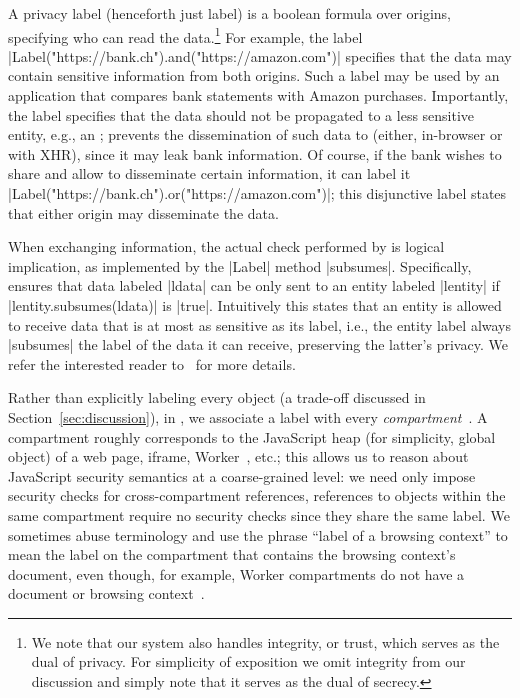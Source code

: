 A privacy label (henceforth just label) is a boolean formula over
origins, specifying who can read the data.\footnote{
  We note that our system also handles integrity, or trust, which
  serves as the dual of privacy.
  For simplicity of exposition we omit integrity from our discussion
  and simply note that it serves as the dual of secrecy.

}
%
For example, the label
\js|Label("https://bank.ch").and("https://amazon.com")| specifies that
the data may contain sensitive information from both origins.
%
Such a label may be used by an application that compares bank
statements with Amazon purchases.
%
Importantly, the label specifies that the data should not be
propagated to a less sensitive entity, e.g., an ;
\sys{} prevents the dissemination of such data to 
(either, in-browser or with XHR), since it may leak bank information.
%
Of course, if the bank wishes to share and allow  to
disseminate certain information, it can label it
\js|Label("https://bank.ch").or("https://amazon.com")|;
this disjunctive label states that either origin may disseminate the
data.

When exchanging information, the actual check performed by \sys{} is
logical implication, as implemented by the \js|Label| method
\js|subsumes|.
%
Specifically, \sys{} ensures that data labeled \js|ldata| can be only sent
to an entity labeled \js|lentity| if
\js|lentity.subsumes(ldata)| is \js|true|.
%
Intuitively this states that an entity is allowed to receive data that
is at most as sensitive as its label, i.e., the entity label
always \js|subsumes| the label of the data it can receive,
preserving the latter's privacy.
%
We refer the interested reader to~\cite{stefan:2011:dclabels} for more
details.

Rather than explicitly labeling every object (a trade-off discussed in
Section~\ref{sec:discussion}), in \sys, we associate a label with
every \emph{compartment}~\cite{wagner2011compartmental}.
%
A compartment roughly corresponds to the JavaScript heap (for
simplicity, global object) of a web page, iframe, Worker~\cite{workers},
etc.; this allows us to reason about JavaScript security semantics at
a coarse-grained level: we need only impose security checks for
cross-compartment references, references to objects within the same
compartment require no security checks since they share the same
label.
%
We sometimes abuse terminology and use the phrase  ``label of a
browsing context'' to mean the label on the compartment that contains
the browsing context's document, even though, for example, Worker
compartments do not have a document or browsing
context~\cite{workers}.
 
